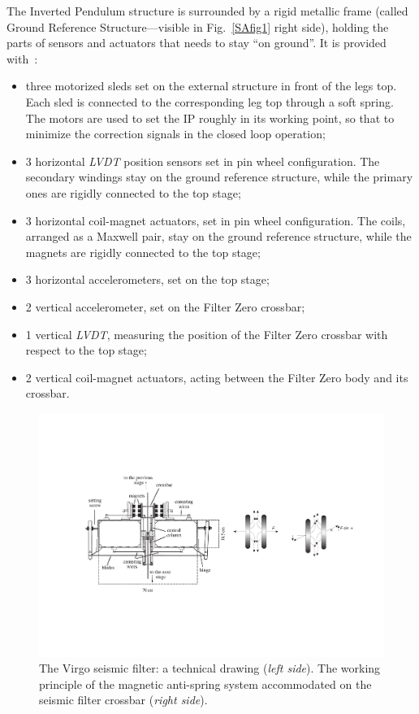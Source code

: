 The Inverted Pendulum structure is surrounded by a rigid metallic frame (called Ground Reference Structure---visible in Fig.~\ref{SAfig1} right side), holding the parts of sensors and actuators that needs to stay ``on ground''. It is provided with~\cite{Losurdo1999,Losurdo2001}:
\begin{itemize}
\item three motorized sleds set on the external structure in front of the legs top. Each sled is connected to the corresponding leg top through a soft spring. The motors are used to set the IP roughly in its working point, so that to minimize the correction signals in the closed loop operation; 
\item 3 horizontal \emph{LVDT} position sensors set in pin wheel configuration. The secondary windings stay on the ground reference structure, while the primary ones are rigidly connected to the top stage;
\item 3 horizontal coil-magnet actuators, set in pin wheel configuration. The coils, arranged as a Maxwell pair, stay on the ground reference structure, while the magnets are rigidly connected to the top stage;
\item 3 horizontal accelerometers, set on the top stage;
\item 2 vertical accelerometer, set on the Filter Zero crossbar;
\item 1 vertical \emph{LVDT}, measuring the position of the Filter Zero crossbar with respect to the top stage;
\item 2 vertical coil-magnet actuators, acting between the Filter Zero body and its crossbar.
\end{itemize}
\begin{figure}[t]
	\begin{center}
		\includegraphics[width=17cm]{./Sec_Suspensions/Figures/SAfig2.pdf}
			\caption{The Virgo seismic filter: a technical drawing (\emph{left side}). The working principle of the magnetic anti-spring system accommodated on the seismic filter crossbar (\emph{right side}).}
\label{SAfig2}
	\end{center}
\end{figure}

